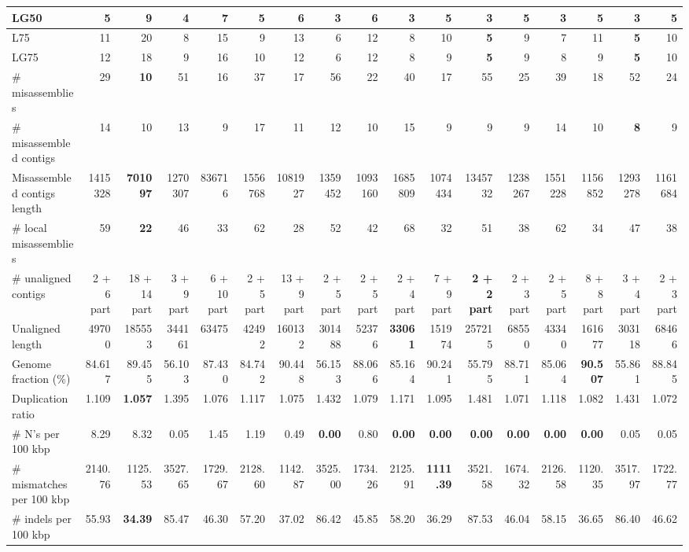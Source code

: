 \documentclass[12pt,a4paper]{article}
\begin{document}
\begin{table}[ht]
\begin{center}
\begin{tabular}{|l*{16}{|r}|}
LG50 & 5 & 9 & 4 & 7 & 5 & 6 & {\bf 3} & 6 & {\bf 3} & 5 & {\bf 3} & 5 & {\bf 3} & 5 & {\bf 3} & 5 \\ \hline
L75 & 11 & 20 & 8 & 15 & 9 & 13 & 6 & 12 & 8 & 10 & {\bf 5} & 9 & 7 & 11 & {\bf 5} & 10 \\ \hline
LG75 & 12 & 18 & 9 & 16 & 10 & 12 & 6 & 12 & 8 & 9 & {\bf 5} & 9 & 8 & 9 & {\bf 5} & 10 \\ \hline
\# misassemblies & 29 & {\bf 10} & 51 & 16 & 37 & 17 & 56 & 22 & 40 & 17 & 55 & 25 & 39 & 18 & 52 & 24 \\ \hline
\# misassembled contigs & 14 & 10 & 13 & 9 & 17 & 11 & 12 & 10 & 15 & 9 & 9 & 9 & 14 & 10 & {\bf 8} & 9 \\ \hline
Misassembled contigs length & 1415328 & {\bf 701097} & 1270307 & 836716 & 1556768 & 1081927 & 1359452 & 1093160 & 1685809 & 1074434 & 1345732 & 1238267 & 1551228 & 1156852 & 1293278 & 1161684 \\ \hline
\# local misassemblies & 59 & {\bf 22} & 46 & 33 & 62 & 28 & 52 & 42 & 68 & 32 & 51 & 38 & 62 & 34 & 47 & 38 \\ \hline
\# unaligned contigs & 2 + 6 part & 18 + 14 part & 3 + 9 part & 6 + 10 part & 2 + 5 part & 13 + 9 part & 2 + 5 part & 2 + 5 part & 2 + 4 part & 7 + 9 part & {\bf 2 + 2 part} & 2 + 3 part & 2 + 5 part & 8 + 8 part & 3 + 4 part & 2 + 3 part \\ \hline
Unaligned length & 49700 & 185553 & 344161 & 63475 & 42492 & 160132 & 301488 & 52376 & {\bf 33061} & 151974 & 257215 & 68550 & 43340 & 161677 & 303118 & 68466 \\ \hline
Genome fraction (\%) & 84.617 & 89.455 & 56.103 & 87.430 & 84.742 & 90.448 & 56.153 & 88.066 & 85.164 & 90.241 & 55.795 & 88.711 & 85.064 & {\bf 90.507} & 55.861 & 88.845 \\ \hline
Duplication ratio & 1.109 & {\bf 1.057} & 1.395 & 1.076 & 1.117 & 1.075 & 1.432 & 1.079 & 1.171 & 1.095 & 1.481 & 1.071 & 1.118 & 1.082 & 1.431 & 1.072 \\ \hline
\# N's per 100 kbp & 8.29 & 8.32 & 0.05 & 1.45 & 1.19 & 0.49 & {\bf 0.00} & 0.80 & {\bf 0.00} & {\bf 0.00} & {\bf 0.00} & {\bf 0.00} & {\bf 0.00} & {\bf 0.00} & 0.05 & 0.05 \\ \hline
\# mismatches per 100 kbp & 2140.76 & 1125.53 & 3527.65 & 1729.67 & 2128.60 & 1142.87 & 3525.00 & 1734.26 & 2125.91 & {\bf 1111.39} & 3521.58 & 1674.32 & 2126.58 & 1120.35 & 3517.97 & 1722.77 \\ \hline
\# indels per 100 kbp & 55.93 & {\bf 34.39} & 85.47 & 46.30 & 57.20 & 37.02 & 86.42 & 45.85 & 58.20 & 36.29 & 87.53 & 46.04 & 58.15 & 36.65 & 86.40 & 46.62 \\ \hline

\end{tabular}
\end{center}
\end{table}
\end{document}
